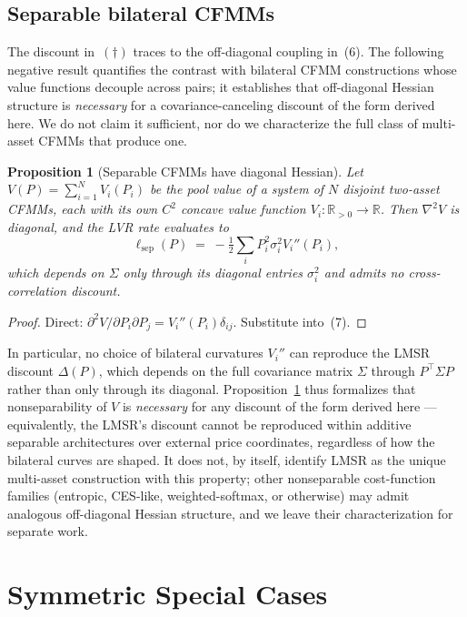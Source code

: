 \documentclass[11pt]{article}
\newtheorem{proposition}{Proposition}
\newcommand{\R}{\mathbb{R}}
\newcommand{\sep}{\mathrm{sep}}
\newcommand{\transp}{^{\!\top}}
\begin{document}
\subsection{Separable bilateral CFMMs}

The discount in~$(\dagger)$ traces to the off-diagonal coupling in~(6). The following negative result quantifies the contrast with bilateral CFMM constructions whose value functions decouple across pairs; it establishes that off-diagonal Hessian structure is \emph{necessary} for a covariance-canceling discount of the form derived here. We do not claim it sufficient, nor do we characterize the full class of multi-asset CFMMs that produce one.

\begin{proposition}[Separable CFMMs have diagonal Hessian]\label{prop:sep}
Let $V(P) = \sum_{i=1}^N V_i(P_i)$ be the pool value of a system of $N$ disjoint two-asset CFMMs, each with its own $C^2$ concave value function $V_i:\R_{>0}\to\R$. Then $\nabla^2 V$ is diagonal, and the LVR rate evaluates to
\[
\ell_{\sep}(P) \;=\; -\tfrac{1}{2}\sum_i P_i^2 \sigma_i^2 V_i''(P_i),
\]
which depends on $\Sigma$ only through its diagonal entries $\sigma_i^2$ and admits no cross-correlation discount.
\end{proposition}
\begin{proof}
Direct: $\partial^2 V/\partial P_i\partial P_j = V_i''(P_i)\delta_{ij}$. Substitute into~(7).
\end{proof}

In particular, no choice of bilateral curvatures $V_i''$ can reproduce the LMSR discount $\Delta(P)$, which depends on the full covariance matrix $\Sigma$ through $P\transp\Sigma P$ rather than only through its diagonal. Proposition~\ref{prop:sep} thus formalizes that nonseparability of $V$ is \emph{necessary} for any discount of the form derived here --- equivalently, the LMSR's discount cannot be reproduced within additive separable architectures over external price coordinates, regardless of how the bilateral curves are shaped. It does not, by itself, identify LMSR as the unique multi-asset construction with this property; other nonseparable cost-function families (entropic, CES-like, weighted-softmax, or otherwise) may admit analogous off-diagonal Hessian structure, and we leave their characterization for separate work.

\section{Symmetric Special Cases}\label{sec:special}
\end{document}
